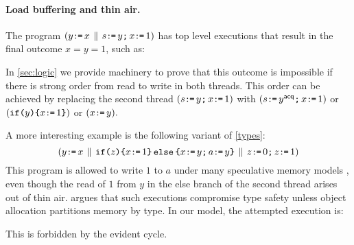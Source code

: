 \paragraph{Load buffering and thin air.}
The program
\begin{math}
  (y\texttt{:}\mkern-1mu\texttt{=}\, x \,\mathbin{\|}\, s\texttt{:}\mkern-1mu\texttt{=}\, y\texttt{;}\, x\texttt{:}\mkern-1mu\texttt{=}\,1)
\end{math}
has top level executions that result in the final outcome $x = y = 1$, such as:
\begin{tikzdisplay}[node distance=1em]
\end{tikzdisplay}
In \textsection\ref{sec:logic} we provide machinery to prove that this
outcome is impossible if there is strong order from read to write in both
threads.  This order can be achieved by replacing the second thread
\begin{math}
  (s\texttt{:}\mkern-1mu\texttt{=}\, y\texttt{;}\, x\texttt{:}\mkern-1mu\texttt{=}\,1)
\end{math}
with 
\begin{math}
  (s\texttt{:}\mkern-1mu\texttt{=}\, y^{\mathsf{acq}}\texttt{;}\, x\texttt{:}\mkern-1mu\texttt{=}\,1)
\end{math}
or
\begin{math}
  (\texttt{if}\allowbreak\texttt{(}y\texttt{)}\allowbreak\texttt{\{} x\texttt{:}\mkern-1mu\texttt{=}\, 1\texttt{\}})
\end{math}
or
\begin{math}
  (x\texttt{:}\mkern-1mu\texttt{=}\, y).
\end{math}

A more interesting example is the following variant of \eqref{types}:
\begin{equation}
  \label{alan}
  (
    y\texttt{:}\mkern-1mu\texttt{=}\, x
  \,\mathbin{\|}\,
    \texttt{if}\allowbreak\texttt{(}z\texttt{)}\allowbreak\texttt{\{} x\texttt{:}\mkern-1mu\texttt{=}\,1 \texttt{\}}\,\allowbreak\texttt{else}\allowbreak\,\texttt{\{} x\texttt{:}\mkern-1mu\texttt{=}\, y\texttt{;}\, a\texttt{:}\mkern-1mu\texttt{=}\, y \texttt{\}}
  \,\mathbin{\|}\,
    z\texttt{:}\mkern-1mu\texttt{=}\,0\texttt{;}\, z\texttt{:}\mkern-1mu\texttt{=}\,1
  )
\end{equation}
This program is allowed to write $1$ to $a$ under many speculative
memory models
\cite{Manson:2005:JMM:1047659.1040336,DBLP:conf/esop/JagadeesanPR10,DBLP:conf/popl/KangHLVD17},
even though the read of $1$ from $y$ in the else branch of the second
thread arises out of thin air.   \citet{DBLP:journals/toplas/Lochbihler13}
argues that such executions compromise type safety unless object allocation
partitions memory by type.
In our model, the attempted execution is:
\begin{tikzdisplay}[node distance=1em]
\end{tikzdisplay}
This is forbidden by the evident cycle.

